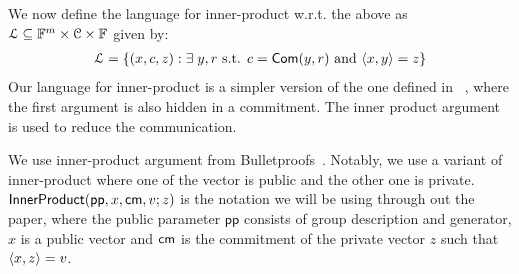 We now define the language for inner-product w.r.t. the above  as $\mathcal{L} \subseteq \mathbb{F}^m \times \mathcal{C} \times \mathbb{F}$ given by:
\begin{equation*}
\begin{array}{l}
\mathcal{L} = \{(x,c,z):\exists \; y,r \text{ s.t. } 
c=\mathsf{Com}(y,r)  \text{ and } \langle x,y\rangle=z\} 
\end{array}
\end{equation*}
Our language for inner-product is a simpler version of the one defined in ~\cite{bulletproofs}, where the first argument is also hidden in a commitment. The inner product argument is used to reduce the communication.

We use inner-product argument from Bulletproofs~\cite{bulletproofs}. Notably, we use a variant of inner-product where one of the vector is public and the other one is private. $\mathsf{InnerProduct}(\mathsf{pp}, x, \mathsf{cm}, v ; z)$ is the notation we will be using through out the paper, where the public parameter $\mathsf{pp}$  consists of group description and generator, $x$ is a public vector and $\mathsf{cm}$ is the commitment of the private vector $z$ such that $\langle x,z\rangle = v$.